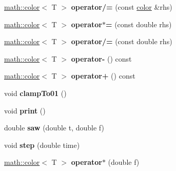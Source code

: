 \begin{DoxyCompactItemize}
\item 
\hypertarget{classmath_1_1color_a97dc77a9176af54c80ec45e2fdc7c2c1}{
\hyperlink{classmath_1_1color}{math::color}$<$ T $>$ {\bfseries operator/=} (const \hyperlink{classmath_1_1color}{color} \&rhs)}
\label{classmath_1_1color_a97dc77a9176af54c80ec45e2fdc7c2c1}

\item 
\hypertarget{classmath_1_1color_acfd6e10d0d53f2ced3ea708fff10ac78}{
\hyperlink{classmath_1_1color}{math::color}$<$ T $>$ {\bfseries operator$\ast$=} (const double rhs)}
\label{classmath_1_1color_acfd6e10d0d53f2ced3ea708fff10ac78}

\item 
\hypertarget{classmath_1_1color_a33294d4d269affa4ffaa797f3932351d}{
\hyperlink{classmath_1_1color}{math::color}$<$ T $>$ {\bfseries operator/=} (const double rhs)}
\label{classmath_1_1color_a33294d4d269affa4ffaa797f3932351d}

\item 
\hypertarget{classmath_1_1color_af1ea618f99b67d536cb0894b566b5bb4}{
\hyperlink{classmath_1_1color}{math::color}$<$ T $>$ {\bfseries operator-\/} () const }
\label{classmath_1_1color_af1ea618f99b67d536cb0894b566b5bb4}

\item 
\hypertarget{classmath_1_1color_a4a5e0f55f75fa364bce5ef78aa62675a}{
\hyperlink{classmath_1_1color}{math::color}$<$ T $>$ {\bfseries operator+} () const }
\label{classmath_1_1color_a4a5e0f55f75fa364bce5ef78aa62675a}

\item 
\hypertarget{classmath_1_1color_a748a8deb173e5e97537ba4432c2a5d59}{
void {\bfseries clampTo01} ()}
\label{classmath_1_1color_a748a8deb173e5e97537ba4432c2a5d59}

\item 
\hypertarget{classmath_1_1color_abe03c9f06859f670f46f4ce091e48ff7}{
void {\bfseries print} ()}
\label{classmath_1_1color_abe03c9f06859f670f46f4ce091e48ff7}

\item 
\hypertarget{classmath_1_1color_a47e30842fd03e25c82f9927b60222832}{
double {\bfseries saw} (double t, double f)}
\label{classmath_1_1color_a47e30842fd03e25c82f9927b60222832}

\item 
\hypertarget{classmath_1_1color_aab530ff0fe2052e4baf4c46ee23c31d4}{
void {\bfseries step} (double time)}
\label{classmath_1_1color_aab530ff0fe2052e4baf4c46ee23c31d4}

\item 
\hypertarget{classmath_1_1color_a620c07c6d66dbf858b6af701bde77b05}{
\hyperlink{classmath_1_1color}{math::color}$<$ T $>$ {\bfseries operator$\ast$} (double f)}
\label{classmath_1_1color_a620c07c6d66dbf858b6af701bde77b05}


\end{DoxyCompactItemize}
